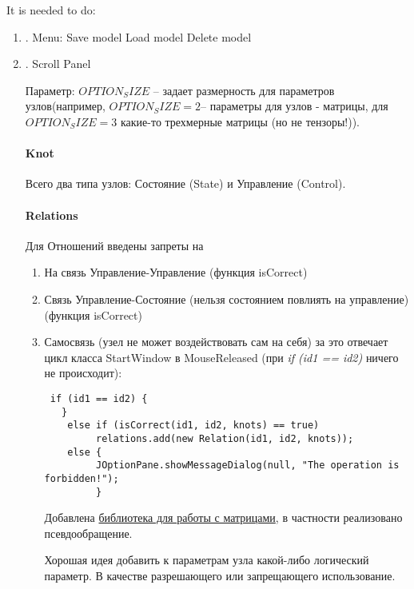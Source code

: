 \documentclass{article}
\begin{document}
\pagestyle{empty}

It is needed to do:
\begin{enumerate}
\item{.} Menu:
 Save model
 Load model
 Delete model

\item{.}  Scroll Panel

Параметр: $OPTION_SIZE$ -- задает размерность для параметров узлов(например, $OPTION_SIZE = 2$-- параметры для узлов - матрицы, для $OPTION_SIZE = 3$ какие-то трехмерные матрицы (но не тензоры!)).

\paragraph{Knot}
Всего два типа узлов: Состояние (State) и Управление (Control).


\paragraph{Relations} 
Для Отношений введены запреты на 
\begin{enumerate}
\item На связь Управление-Управление (функция isCorrect)
\item Связь Управление-Состояние (нельзя состоянием повлиять на управление) (функция isCorrect)
\item Самосвязь (узел не может воздействовать сам на себя) за это отвечает цикл класса StartWindow
в MouseReleased (при {\it{if (id1 == id2)}} ничего не происходит):
\begin{verbatim}
 if (id1 == id2) {
   }
    else if (isCorrect(id1, id2, knots) == true)
         relations.add(new Relation(id1, id2, knots));
    else {
         JOptionPane.showMessageDialog(null, "The operation is forbidden!");
         }
\end{verbatim}

Добавлена \href{http://javadox.com/com.googlecode.efficient-java-matrix-library/ejml/0.23/org/ejml/alg/dense/linsol/svd/SolvePseudoInverseSvd.html}{библиотека для работы с матрицами}, в частности реализовано псевдообращение.

Хорошая идея добавить к параметрам узла какой-либо логический параметр. В качестве разрешающего или запрещающего использование.

\end{enumerate}



\end{enumerate}
\end{document}
